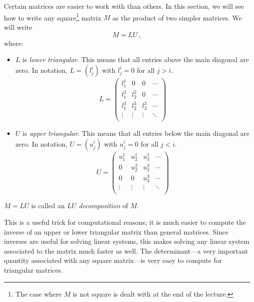 \chapter{\luDecompTitle}
\label{LUdecomp}

Certain matrices are easier to work with than others.  In this section, we will see how to write any square\footnote{The case where $M$ is not square is dealt with at the end of the lecture.} matrix $M$ as the product of two simpler matrices.  We will write \[M=LU\, ,\] where:
\begin{itemize}
\item $L$ is \emph{lower triangular}.  This means that all entries above the main diagonal are zero.  In notation,
$L=(l^i_j)$ with $l^i_j=0$ for all $j>i$.
\[L=\begin{pmatrix}
l^1_1 & 0 & 0 & \cdots \\
l^2_1 & l^2_2 & 0 & \cdots \\
l^3_1 & l^3_2 & l^3_3 & \cdots \\
\vdots & \vdots & \vdots & \ddots \\
\end{pmatrix}
\]

\item $U$ is \emph{upper triangular}.  This means that all entries below the main diagonal are zero.  In notation,
$U=(u^i_j)$ with $u^i_j=0$ for all $j<i$.
\[U=\begin{pmatrix}
u^1_1 & u^1_2 & u^1_3 & \cdots \\
0 & u^2_2 & u^2_3 & \cdots \\
0 & 0 & u^3_3 & \cdots \\
\vdots & \vdots & \vdots & \ddots \\
\end{pmatrix}
\]
\end{itemize}
$M=LU$ is called an \emph{$LU$ decomposition} of $M$.

This is a useful trick for  computational reasons; it is much easier to compute the inverse of an upper or lower triangular matrix than general matrices.  Since inverses are useful for solving linear systems, this makes solving any linear system associated to the matrix much faster as well.  The determinant---a very important quantity associated with any square matrix---is very easy to compute for triangular matrices.


